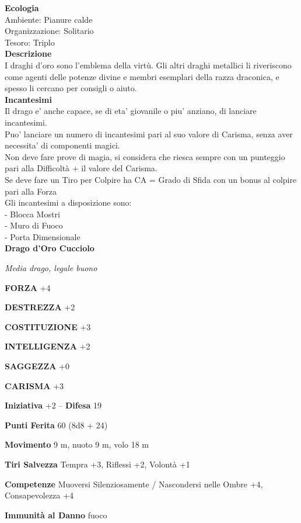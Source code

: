 \begin{multicols}{2}
\textbf{Ecologia}\\
Ambiente: Pianure calde\\
Organizzazione: Solitario\\
Tesoro: Triplo\\
\textbf{Descrizione}\\
I draghi d'oro sono l'emblema della virtù. Gli altri draghi metallici li riveriscono come agenti delle potenze divine e membri esemplari della razza draconica, e spesso li cercano per consigli o aiuto.\\
\textbf{Incantesimi}\\
Il drago e' anche capace, se di eta' giovanile o piu' anziano, di lanciare incantesimi.\\
Puo' lanciare un numero di incantesimi pari al suo valore di Carisma, senza aver necessita' di componenti magici.\\
Non deve fare prove di magia, si considera che riesca sempre con un punteggio pari alla Difficoltà + il valore del Carisma.\\
Se deve fare un Tiro per Colpire ha CA = Grado di Sfida con un bonus al colpire pari alla Forza\\
Gli incantesimi a disposizione sono:\\
- Blocca Mostri\\
- Muro di Fuoco\\
- Porta Dimensionale\\

\medskip{}\textbf{Drago d'Oro Cucciolo}

\emph{Media drago, legale buono}

\textbf{FORZA} +4

\textbf{DESTREZZA} +2

\textbf{COSTITUZIONE} +3

\textbf{INTELLIGENZA} +2

\textbf{SAGGEZZA} +0

\textbf{CARISMA} +3

\textbf{Iniziativa} +2 -- \textbf{Difesa} 19

\textbf{Punti Ferita} 60 (8d8 + 24)

\textbf{Movimento} 9 m, nuoto 9 m, volo 18 m

\textbf{Tiri Salvezza} Tempra +3, Riflessi +2, Volontà +1

\textbf{Competenze} Muoversi Silenziosamente / Nascondersi nelle Ombre +4, Consapevolezza +4

\textbf{Immunità al Danno} fuoco


\end{multicols}
